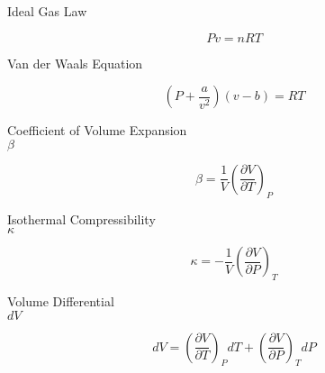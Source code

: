 \documentclass[avery5371,grid]{flashcards}
\newcommand{\pderiv}[2]{\frac{\partial#1}{\partial#2}}
\begin{document}

\begin{flashcard}[Equation]{Ideal Gas Law}
  \begin{center}
    \begin{displaymath}
      Pv = nRT
    \end{displaymath}
  \end{center}
\end{flashcard}

\begin{flashcard}[Equation]{Van der Waals Equation}
  \begin{center}
    \begin{displaymath}
      \left(P+\frac{a}{v^2}\right)\left(v-b\right) = RT
    \end{displaymath}
  \end{center}
\end{flashcard}

\begin{flashcard}[Definition]{Coefficient of Volume Expansion\\$\beta$}
  \begin{center}
    \begin{displaymath}
      \beta = \frac{1}{V}{\left(\pderiv{V}{T}\right)}_P
    \end{displaymath}
  \end{center}
\end{flashcard}

\begin{flashcard}[Definition]{Isothermal Compressibility\\$\kappa$}
  \begin{center}
    \begin{displaymath}
      \kappa= -\frac{1}{V}\left(\pderiv{V}{P}\right)_T
    \end{displaymath}
  \end{center}
\end{flashcard}

\begin{flashcard}[Equation]{Volume Differential\\$dV$}
  \begin{center}
    \begin{displaymath}
      dV = {\left(\pderiv{V}{T}\right)}_P\!\!dT  + {\left(\pderiv{V}{P}\right)}_T\!\!dP
    \end{displaymath}
  \end{center}
\end{flashcard}
\end{document}
